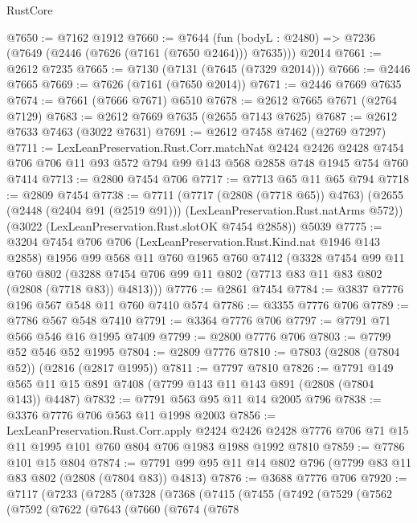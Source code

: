 \begin{lexlean}{RustCore}
\begin{coremodule}
@7650 := @7162 @1912
@7660 := @7644
    (fun (bodyL : @2480) => @7236 (@7649 (@2446 (@7626 (@7161 (@7650 @2464))) @7635)))
    @2014
@7661 := @2612 @7235
@7665 := @7130 (@7131 (@7645 (@7329 @2014)))
@7666 := @2446 @7665
@7669 := @7626 (@7161 (@7650 @2014))
@7671 := @2446 @7669 @7635
@7674 := @7661 (@7666 @7671) @6510
@7678 := @2612 @7665 @7671 (@2764 @7129)
@7683 := @2612 @7669 @7635 (@2655 @7143 @7625)
@7687 := @2612 @7633 @7463 (@3022 @7631)
@7691 := @2612 @7458 @7462 (@2769 @7297)
@7711 := LexLeanPreservation.Rust.Corr.matchNat
    @2424
    @2426
    @2428
    @7454
    @706
    @706
    @11
    @93
    @572
    @794
    @99
    @143
    @568
    @2858
    @748
    @1945
    @754
    @760
    @7414
@7713 := @2800 @7454 @706
@7717 := @7713 @65 @11 @65 @794
@7718 := @2809 @7454
@7738 := @7711
    (@7717 (@2808 (@7718 @65)) @4763)
    (@2655 (@2448 (@2404 @91 (@2519 @91))) (LexLeanPreservation.Rust.natArms @572))
    (@3022 (LexLeanPreservation.Rust.slotOK @7454 @2858))
    @5039
@7775 := @3204
    @7454
    @706
    @706
    (LexLeanPreservation.Rust.Kind.nat @1946 @143 @2858)
    @1956
    @99
    @568
    @11
    @760
    @1965
    @760
    @7412
    (@3328
      @7454
      @99
      @11
      @760
      @802
      (@3288 @7454 @706 @99 @11 @802 (@7713 @83 @11 @83 @802 (@2808 (@7718 @83)) @4813)))
@7776 := @2861 @7454
@7784 := @3837 @7776 @196 @567 @548 @11 @760 @7410 @574
@7786 := @3355 @7776 @706
@7789 := @7786 @567 @548 @7410
@7791 := @3364 @7776 @706
@7797 := @7791 @71 @566 @546 @16 @1995 @7409
@7799 := @2800 @7776 @706
@7803 := @7799 @52 @546 @52 @1995
@7804 := @2809 @7776
@7810 := @7803 (@2808 (@7804 @52)) (@2816 (@2817 @1995))
@7811 := @7797 @7810
@7826 := @7791 @149 @565 @11 @15 @891 @7408 (@7799 @143 @11 @143 @891 (@2808 (@7804 @143)) @4487)
@7832 := @7791 @563 @95 @11 @14 @2005 @796
@7838 := @3376 @7776 @706 @563 @11 @1998 @2003
@7856 := LexLeanPreservation.Rust.Corr.apply
    @2424
    @2426
    @2428
    @7776
    @706
    @71
    @15
    @11
    @1995
    @101
    @760
    @804
    @706
    @1983
    @1988
    @1992
    @7810
@7859 := @7786 @101 @15 @804
@7874 := @7791 @99 @95 @11 @14 @802 @796 (@7799 @83 @11 @83 @802 (@2808 (@7804 @83)) @4813)
@7876 := @3688 @7776 @706
@7920 := @7117
    (@7233
      (@7285
        (@7328
          (@7368
            (@7415
              (@7455
                (@7492
                  (@7529
                    (@7562
                      (@7592
                        (@7622
                          (@7643
                            (@7660
                              (@7674
                                (@7678

\end{coremodule}
\end{lexlean}
